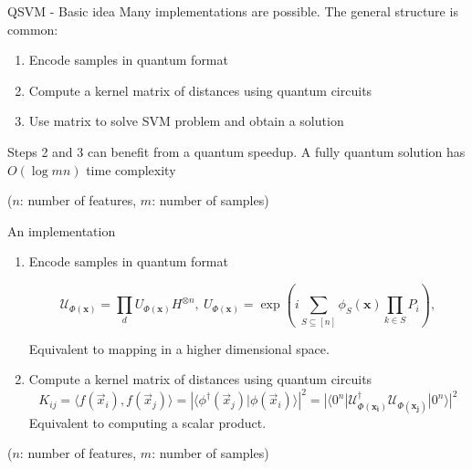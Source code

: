\begin{frame}{QSVM - Basic idea}
    Many implementations are possible. The general structure is common:
    \begin{enumerate}
        \item Encode samples in quantum format
        \item Compute a kernel matrix of distances using quantum circuits
        \item Use matrix to solve SVM problem and obtain a solution
    \end{enumerate}
    Steps 2 and 3 can benefit from a quantum speedup. A fully quantum solution has $O(\log mn)$ time complexity 
    
    ($n$: number of features, $m$: number of samples)
\end{frame}

\begin{frame}{An implementation}
    \begin{enumerate}
        \item Encode samples in quantum format
        
        $$ \mathcal{U}_{\Phi(\mathbf{x})}=\prod_d U_{\Phi(\mathbf{x})}H^{\otimes n},\ U_{\Phi(\mathbf{x})}=\exp\left(i\sum_{S\subseteq[n]}\phi_S(\mathbf{x})\prod_{k\in S} P_i\right), $$
        
        Equivalent to mapping in a higher dimensional space.
        \vspace{0.5mm}
        \item Compute a kernel matrix of distances using quantum circuits
        $$K_{ij} = \langle f(\vec{x}_i), f(\vec{x}_j) \rangle = \left| \langle \phi^\dagger(\vec{x}_j)| \phi(\vec{x}_i) \rangle \right|^{2} = 
        |\langle 0^n |\mathcal{U}_{\Phi(\mathbf{x_i})}^{\dagger}\mathcal{U}_{\Phi(\mathbf{x_j})}| 0^n \rangle |^2
        $$
        Equivalent to computing a scalar product.
    \end{enumerate}
    
    ($n$: number of features, $m$: number of samples)
\end{frame}

